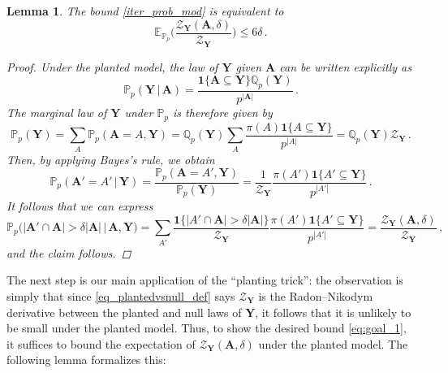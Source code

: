 \documentclass[11pt,reqno]{amsart}
\theoremstyle{plain}
\newtheorem{lemma}[theorem]{Lemma}
\theoremstyle{definition}
\theoremstyle{remark}
\newcommand{\Q}{\mathbb{Q}}
\newcommand{\PP}{\mathbb{P}}
\newcommand{\EE}{\mathbb{E}}
\newcommand{\bA}{\mathbf{A}}
\newcommand{\bY}{\mathbf{Y}}
\newcommand{\cZ}{\mathcal{Z}}
\begin{document}
\begin{lemma}\label{l:planted.to.null}
The bound \eqref{iter_prob_mod} is equivalent to
    \begin{equation}\label{eq:goal_1}
    \EE_{\PP_p}\bigg( 
    \frac{\cZ_{\bY}(\bA,\delta)}{\cZ_{\bY}}
    \bigg) \leq 6\delta\,. 
    \end{equation}
    
\begin{proof}
Under the planted model, the law of $\bY$ given $\bA$ can be written explicitly as
	\[
	\PP_p(\bY\,|\,\bA)
	=\frac{\mathbf{1}\{\bA\subseteq \bY\} \Q_p(\bY)}{p^{|\bA|}}\,.
	\]
The marginal law of $\bY$ under $\PP_p$ is therefore given by
	\begin{equation}\label{eq_plantedvsnull_def}
	\PP_p(\bY)
	= \sum_A\PP_p(\bA=A,\bY)
	=\Q_p(\bY) \sum_A
	\frac{\pi(A)\mathbf{1}\{A\subseteq \bY\} }{p^{|A|}}
	=\Q_p(\bY)  \cZ_{\bY}\,.
	\end{equation}
Then, by applying Bayes's rule, we obtain
	\[
	\PP_p(\bA'=A'\,|\,\bY)
	= \frac{\PP_p(\bA=A',\bY)}{\PP_p(\bY)}
	= \frac{1}{\cZ_{\bY}}
	\frac{\pi(A')\mathbf{1}\{A'\subseteq \bY\} }{p^{|A'|}}\,.
	\]
It follows that we can express
	\begin{equation}\label{e:cZ.delta}
	\PP_p\Big(|\bA'\cap\bA| > \delta|\bA| \,\Big|\,\bA,\bY\Big)
	=\sum_{A'}
\frac{ \mathbf{1}\{|A' \cap \bA| 
	> \delta|\bA| \} }{\cZ_{\bY}}
\frac{
 \pi(A')\mathbf{1}\{ A'\subseteq\bY\}}{p^{|A'|}} 
	=
	\frac{\cZ_{\bY}(\bA,\delta)}{\cZ_{\bY}}\,,
	\end{equation}
and the claim follows.
\end{proof}
\end{lemma}


The next step is our main application of the ``planting trick'': the observation is simply that since \eqref{eq_plantedvsnull_def} says $\cZ_{\bY}$ is the Radon--Nikodym derivative between the planted and null laws of $\bY$, it follows that it is unlikely to be small under the planted model. Thus, to show the desired bound \eqref{eq:goal_1}, it suffices to bound the expectation of $\cZ_{\bY}(\bA,\delta)$ under the planted model. The following lemma formalizes this:
\end{document}
